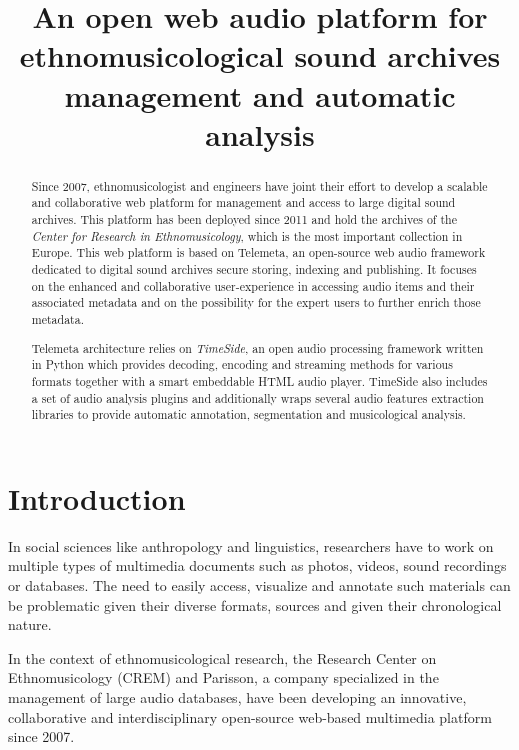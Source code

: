 \documentclass{paper}
\title{An open web audio platform for ethnomusicological sound archives management and automatic analysis}
\begin{document}
%
\maketitle
%
\begin{abstract}
Since 2007, ethnomusicologist and engineers have joint their effort to develop a scalable and collaborative web platform for management and access to large digital sound archives. This platform has been deployed since 2011 and hold the archives of the \emph{Center for Research in Ethnomusicology}, which is the most important collection in Europe.
This web platform is based on Telemeta, an open-source web audio framework dedicated to digital sound archives secure storing, indexing and publishing. It focuses on the enhanced and collaborative user-experience in accessing audio items and their associated metadata and on the possibility for the expert users to further enrich those metadata.

 Telemeta architecture relies on \emph{TimeSide}, an open audio processing framework written in Python which provides decoding,  encoding and streaming methods for various formats together with a smart embeddable HTML audio player. TimeSide also includes a set of audio analysis plugins and additionally wraps several audio features extraction libraries to provide automatic annotation, segmentation and musicological analysis.

\end{abstract}

\section{Introduction}\label{sec:intro}

 In social sciences like anthropology and linguistics, researchers have to work on multiple types of multimedia documents such as photos, videos, sound recordings or databases. The need to easily access, visualize and annotate such materials can be problematic given their diverse formats, sources and given their chronological nature.

  In the context of ethnomusicological research, the Research Center on Ethnomusicology (CREM) and Parisson, a company specialized in the management of large audio databases, have been developing an innovative, collaborative and interdisciplinary open-source web-based multimedia platform since 2007. 
\end{document}
